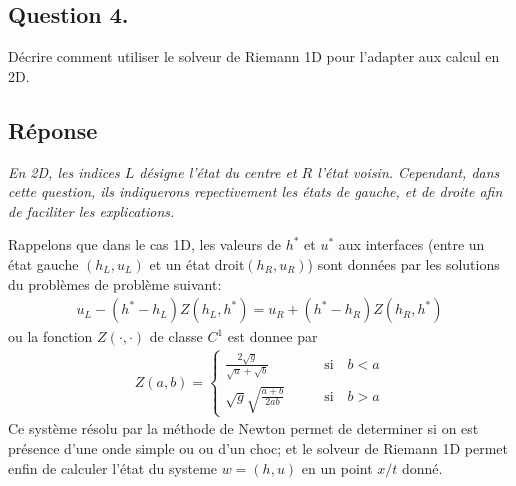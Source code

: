 \documentclass[
	french,
	11pt, %
]{fphw}
\begin{document}
\subsection*{Question 4.}

\begin{problem}
	Décrire comment utiliser le solveur de Riemann 1D pour l’adapter aux calcul en 2D.
\end{problem}


\subsection*{Réponse} 

\textit{En 2D, les indices $L$ désigne l'état du centre et $R$ l'état voisin. Cependant, dans cette question, ils indiquerons repectivement les états de gauche, et de droite afin de faciliter les explications.}

Rappelons que dans le cas 1D, les valeurs de $h^*$ et $u^*$ aux interfaces (entre un état gauche $(h_L,u_L)$ et un état droit$(h_R,u_R)$) sont données par les solutions du problèmes de problème suivant:
\begin{align*}
	u_L - (h^* - h_L)Z(h_L, h^*) = u_R + (h^* - h_R)Z(h_R, h^*)
\end{align*}
ou la fonction $Z(\cdot, \cdot)$ de classe $C^1$ est donnee par
\begin{align*}
	Z(a,b) = 
	\begin{cases}
		\frac{2\sqrt{g}}{\sqrt{a}+\sqrt{b}}	 &\qquad	\text{si} \quad b<a \\
		\sqrt{g}\sqrt{\frac{a+b}{2ab}}	 &\qquad	\text{si} \quad b>a 
	\end{cases}
\end{align*}
Ce système résolu par la méthode de Newton permet de determiner si on est présence d'une onde simple ou ou d'un choc; et le solveur de Riemann 1D permet enfin de calculer l'état du systeme $w = (h,u)$ en un point $x/t$ donné.
\end{document}
